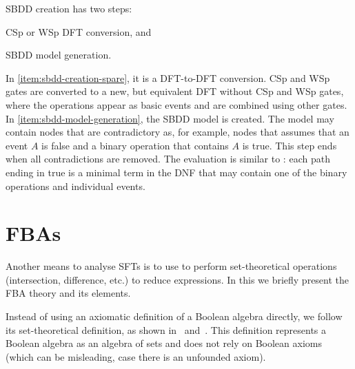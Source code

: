 \documentclass[12pt,openright,twoside,a4paper,oldfontcommands,english,brazil,final]{abntex2}
\theoremstyle{theo}
\begin{document}
\Ac{SBDD} creation has two steps:
\begin{alineasinline}
  \item \ac{CSp} or \ac{WSp} \ac{DFT} conversion, and \label{item:sbdd-creation-spare}
  \item \ac{SBDD} model generation.\label{item:sbdd-model-generation}
\end{alineasinline}
In \ref{item:sbdd-creation-spare}, it is a \ac{DFT}-to-\ac{DFT} conversion.
\Ac{CSp} and \ac{WSp} gates are converted to a new, but equivalent \ac{DFT} without \ac{CSp} and \ac{WSp} gates, where the operations appear as basic events and are combined using other gates.
In \ref{item:sbdd-model-generation}, the \ac{SBDD} model is created.
The model may contain nodes that are contradictory as, for example, nodes that assumes that an event $A$ is false and a binary operation that contains $A$ is true.
This step ends when all contradictions are removed.
The evaluation is similar to : each path ending in true is a minimal term in the \ac{DNF} that may contain one of the binary operations and individual events.


\section[Free Boolean Algebras]{\Aclp*{FBA}}
\label{sec:fba}

Another means to analyse \acp{SFT} is to use  to perform set-theoretical operations (intersection, difference, etc.) to reduce expressions.
In this  we briefly present the \ac{FBA} theory and its elements.

Instead of using an axiomatic definition of a Boolean algebra directly, we follow its set-theoretical definition, as shown in~\cite[pp. 254--258]{Stoll1979} and~\cite[pp. 8--11]{GH2009}.
This definition represents a Boolean algebra as an algebra of sets and does not rely on Boolean axioms (which can be misleading, case there is an unfounded axiom).
\end{document}
